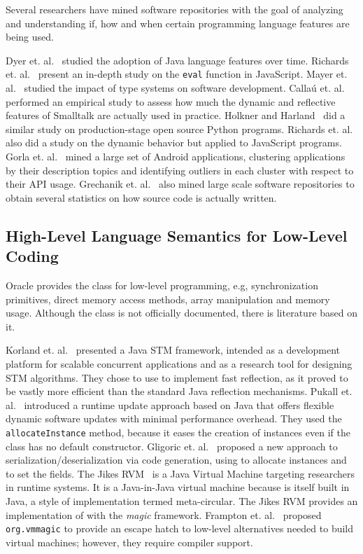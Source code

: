Several researchers have mined software repositories with the goal of analyzing and understanding if, how and when certain programming language features are being used.

Dyer et. al.~\cite{Dyer-Rajan-Nguyen-Nguyen-14} studied the adoption of Java language features over time. Richards et. al.~\cite{Richards:2011:EML:2032497.2032503} present an in-depth study on the \texttt{eval} function in JavaScript. Mayer et. al.~\cite{Mayer:2012:ESI:2384616.2384666} studied the impact of type systems on software development. Calla\'{u} et. al.~\cite{Callau:2011:DUD:1985441.1985448} performed an empirical study to assess how much the dynamic and reflective features of Smalltalk are actually used in practice. Holkner and Harland~\cite{Holkner:2009:EDB:1862659.1862665} did a similar study on production-stage open source Python programs. Richards et. al.~\cite{Richards:2010:ADB:1806596.1806598} also did a study on the dynamic behavior but applied to JavaScript programs. Gorla et. al.~\cite{Gorla:2014:CAB:2568225.2568276} mined a large set of Android applications, clustering applications by their description topics and identifying outliers in each cluster with respect to their API usage. Grechanik et. al.~\cite{Grechanik:2010:EIL:1852786.1852801} also mined large scale software repositories to obtain several statistics on how source code is actually written.

\subsection{High-Level Language Semantics for Low-Level Coding}

Oracle provides the \smu{} class for low-level programming, e.g, synchronization primitives, direct memory access methods, array manipulation and memory usage. Although the \smu{} class is not officially documented, there is literature based on it.

Korland et. al.~\cite{Korl_noninvasiveconcurrency} presented a Java STM framework, intended as a development platform for scalable concurrent applications and as a research tool for designing STM algorithms. They chose to use \smu{} to implement fast reflection, as it proved to be vastly more efficient than the standard Java reflection mechanisms. Pukall et. al.~\cite{SPE:SPE2107} introduced a runtime update approach based on Java that offers flexible dynamic software updates with minimal performance overhead. They used the \texttt{allocateInstance} method, because it eases the creation of instances even if the class has no default constructor. Gligoric et. al.~\cite{Gligoric:2011:CFD:2001420.2001456} proposed a new approach to serialization/deserialization via code generation, using \smu{} to allocate instances and to set the fields. The Jikes RVM~\cite{Alpern:2005:JRV:1086608.1086625} is a Java Virtual Machine targeting researchers in runtime systems. It is a Java-in-Java virtual machine because is itself built in Java, a style of implementation termed meta-circular. The Jikes RVM provides an implementation of \smu{} with the \emph{magic} framework. Frampton et. al.~\cite{Frampton:2009:DMH:1508293.1508305} proposed \texttt{org.vmmagic} to provide an escape hatch to low-level alternatives needed to build virtual machines; however, they require compiler support.
